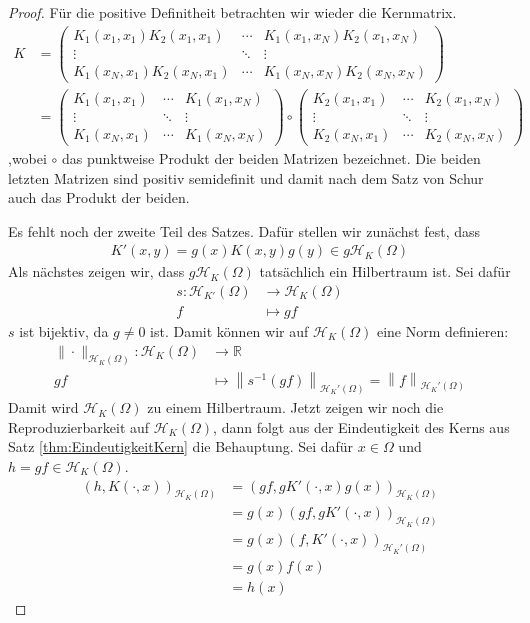 \begin{proof}
Für die positive Definitheit betrachten wir wieder die Kernmatrix.
\begin{align*}
K &= 
\begin{pmatrix}
K_1(x_1,x_1)K_2(x_1, x_1) & \cdots & K_1(x_1,x_N)K_2(x_1, x_N) \\ 
\vdots & \ddots & \vdots \\ 
K_1(x_N,x_1)K_2(x_N, x_1) & \cdots & K_1(x_N,x_N)K_2(x_N, x_N)
\end{pmatrix} \\
&= 
\begin{pmatrix}
K_1(x_1,x_1) & \cdots & K_1(x_1,x_N) \\ 
\vdots & \ddots & \vdots \\ 
K_1(x_N,x_1) & \cdots & K_1(x_N,x_N)
\end{pmatrix}
\circ
\begin{pmatrix}
K_2(x_1, x_1) & \cdots & K_2(x_1, x_N) \\ 
\vdots & \ddots & \vdots \\ 
K_2(x_N, x_1) & \cdots & K_2(x_N, x_N)
\end{pmatrix}
\end{align*}
,wobei $\circ$ das punktweise Produkt der beiden Matrizen bezeichnet. 
Die beiden letzten Matrizen sind positiv semidefinit und damit nach dem Satz von Schur auch das Produkt der beiden.

Es fehlt noch der zweite Teil des Satzes. Dafür stellen wir zunächst fest, dass 
\begin{align*}
K'(x,y) = g(x) K(x,y) g(y) \in g \mathcal{H}_K (\Omega)
\end{align*}
Als nächstes zeigen wir, dass $g\mathcal{H}_K(\Omega)$ tatsächlich ein Hilbertraum ist. Sei dafür
\begin{align*}
s : \mathcal{H}_{K'} (\Omega) &\rightarrow \mathcal{H}_K (\Omega)\\
f &\mapsto gf
\end{align*}
$s$ ist bijektiv, da $g \neq 0$ ist. Damit können wir auf $\mathcal{H}_K (\Omega)$ eine Norm definieren:
\begin{align*}
\| \cdot \|_{\mathcal{H}_K(\Omega)} : \mathcal{H}_K(\Omega) &\rightarrow \mathbb{R}\\
gf &\mapsto \left\| s^{-1}(gf)\right\|_{\mathcal{H}_K'(\Omega)} = \left\|f\right\|_{\mathcal{H}_K'(\Omega)}
\end{align*}
Damit wird $\mathcal{H}_K(\Omega)$ zu einem Hilbertraum. Jetzt zeigen wir noch die Reproduzierbarkeit auf $\mathcal{H}_K(\Omega)$, dann folgt aus der Eindeutigkeit des Kerns aus Satz \ref{thm:EindeutigkeitKern} die Behauptung. Sei dafür $x \in \Omega$ und $h = gf \in \mathcal{H}_K (\Omega)$.
\begin{align*}
\left(h, K(\cdot,x) \right)_{\mathcal{H}_K(\Omega)} &= \left(gf, gK'(\cdot, x) g(x)\right)_{\mathcal{H}_K(\Omega)}\\
&= g(x) \left( gf, gK'(\cdot, x)\right)_{\mathcal{H}_K(\Omega)}\\
&= g(x) \left( f, K'(\cdot, x)\right)_{\mathcal{H}_K'(\Omega)}\\
&= g(x) f(x)\\
&= h(x)
\end{align*}
\end{proof}

